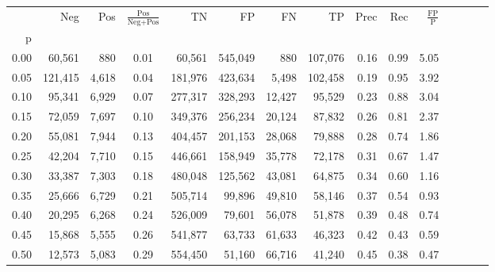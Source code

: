 \begin{tabular}{rrrcrrrrrrrrrrr}
\toprule
{} &      Neg &     Pos & $\frac{\text{Pos}}{\text{Neg}+\text{Pos}}$ &       TN &       FP &       FN &       TP &  Prec &   Rec & $\frac{\text{FP}}{\text{P}}$ \\
p    &          &         &                                            &          &          &          &          &       &       &                              \\
\midrule
0.00 &   60,561 &     880 &                                       0.01 &   60,561 &  545,049 &      880 &  107,076 &  0.16 &  0.99 &                         5.05 \\
0.05 &  121,415 &   4,618 &                                       0.04 &  181,976 &  423,634 &    5,498 &  102,458 &  0.19 &  0.95 &                         3.92 \\
0.10 &   95,341 &   6,929 &                                       0.07 &  277,317 &  328,293 &   12,427 &   95,529 &  0.23 &  0.88 &                         3.04 \\
0.15 &   72,059 &   7,697 &                                       0.10 &  349,376 &  256,234 &   20,124 &   87,832 &  0.26 &  0.81 &                         2.37 \\
0.20 &   55,081 &   7,944 &                                       0.13 &  404,457 &  201,153 &   28,068 &   79,888 &  0.28 &  0.74 &                         1.86 \\
0.25 &   42,204 &   7,710 &                                       0.15 &  446,661 &  158,949 &   35,778 &   72,178 &  0.31 &  0.67 &                         1.47 \\
0.30 &   33,387 &   7,303 &                                       0.18 &  480,048 &  125,562 &   43,081 &   64,875 &  0.34 &  0.60 &                         1.16 \\
0.35 &   25,666 &   6,729 &                                       0.21 &  505,714 &   99,896 &   49,810 &   58,146 &  0.37 &  0.54 &                         0.93 \\
0.40 &   20,295 &   6,268 &                                       0.24 &  526,009 &   79,601 &   56,078 &   51,878 &  0.39 &  0.48 &                         0.74 \\
0.45 &   15,868 &   5,555 &                                       0.26 &  541,877 &   63,733 &   61,633 &   46,323 &  0.42 &  0.43 &                         0.59 \\
0.50 &   12,573 &   5,083 &                                       0.29 &  554,450 &   51,160 &   66,716 &   41,240 &  0.45 &  0.38 &                         0.47 \\

\end{tabular}
